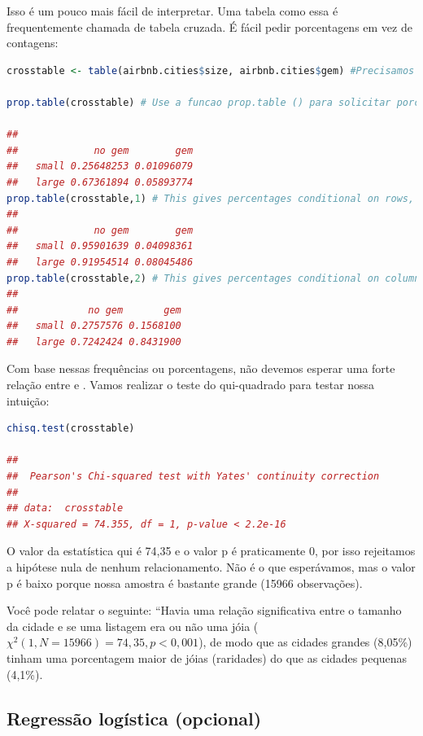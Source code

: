 \documentclass{article}
\begin{document}
Isso é um pouco mais fácil de interpretar. Uma tabela como essa é frequentemente chamada de tabela cruzada. É fácil pedir porcentagens em vez de contagens:

\begin{lstlisting}[language=R]
crosstable <- table(airbnb.cities$size, airbnb.cities$gem) #Precisamos salvar a tabela cruzada primeiro.

prop.table(crosstable) # Use a funcao prop.table () para solicitar porcentagens.

##        
##             no gem        gem
##   small 0.25648253 0.01096079
##   large 0.67361894 0.05893774
prop.table(crosstable,1) # This gives percentages conditional on rows, i.e., the percentages in the rows sum to 1.
##        
##             no gem        gem
##   small 0.95901639 0.04098361
##   large 0.91954514 0.08045486
prop.table(crosstable,2) # This gives percentages conditional on columns, i.e., the percentages in the columns sum to 1.
##        
##            no gem       gem
##   small 0.2757576 0.1568100
##   large 0.7242424 0.8431900
\end{lstlisting}

Com base nessas frequências ou porcentagens, não devemos esperar uma forte relação entre  e . Vamos realizar o teste do qui-quadrado para testar nossa intuição:

\begin{lstlisting}[language=R]
chisq.test(crosstable)

## 
##  Pearson's Chi-squared test with Yates' continuity correction
## 
## data:  crosstable
## X-squared = 74.355, df = 1, p-value < 2.2e-16
\end{lstlisting}

O valor da estatística qui é 74,35 e o valor p é praticamente 0, por isso rejeitamos a hipótese nula de nenhum relacionamento. Não é o que esperávamos, mas o valor p é baixo porque nossa amostra é bastante grande (15966 observações). 

Você pode relatar o seguinte: “Havia uma relação significativa entre o tamanho da cidade e se uma listagem era ou não uma jóia ($\chi^{2} (1, N = 15966) = 74,35, p <0,001$), de modo que as cidades grandes (8,05\%) tinham uma porcentagem maior de jóias (raridades) do que as cidades pequenas (4,1\%). 

\subsection{Regressão logística (opcional)}
\end{document}

